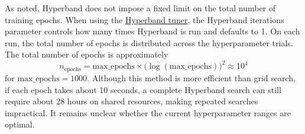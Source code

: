 As noted, Hyperband does not impose a fixed limit on the total number of training epochs. When using the \href{https://keras.io/api/keras_tuner/tuners/hyperband/}{Hyperband tuner}, the Hyperband iterations parameter controls how many times Hyperband is run and defaults to 1. On each run, the total number of epochs is distributed across the hyperparameter trials. The total number of epochs is approximately
%
\begin{equation*}
n_{\mathrm{epochs}} = \text{max\_epochs} \times \bigl(\log(\text{max\_epochs})\bigr)^2 \approx 10^4
\end{equation*}
%
for $ \text{max\_epochs} = 1000$. Although this method is more efficient than grid search, if each epoch takes about 10 seconds, a complete Hyperband search can still require about 28 hours on shared resources, making repeated searches impractical. It remains unclear whether the current hyperparameter ranges are optimal.